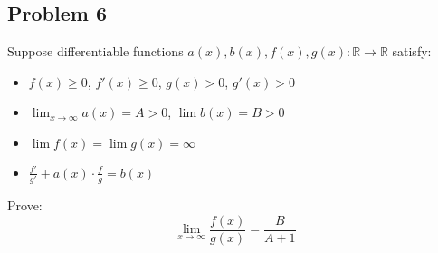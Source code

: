 \documentclass{article}
\begin{document}
\subsection*{Problem 6}
Suppose differentiable functions \( a(x), b(x), f(x), g(x) : \mathbb{R} \to \mathbb{R} \) satisfy:

\begin{itemize}
  \item \( f(x) \geq 0 \), \( f'(x) \geq 0 \), \( g(x) > 0 \), \( g'(x) > 0 \)
  \item \( \lim_{x \to \infty} a(x) = A > 0 \), \( \lim b(x) = B > 0 \)
  \item \( \lim f(x) = \lim g(x) = \infty \)
  \item \( \frac{f'}{g'} + a(x) \cdot \frac{f}{g} = b(x) \)
\end{itemize}

Prove:
\[
\lim_{x \to \infty} \frac{f(x)}{g(x)} = \frac{B}{A + 1}
\]
\end{document}
